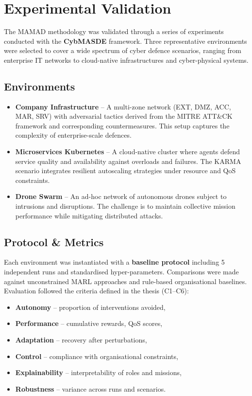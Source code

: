 \documentclass[a4paper,10pt,twocolumn]{article}
\begin{document}
\section{Experimental Validation}

The MAMAD methodology was validated through a series of experiments
conducted with the \textbf{CybMASDE} framework. Three representative
environments were selected to cover a wide spectrum of cyber defence
scenarios, ranging from enterprise IT networks to cloud-native
infrastructures and cyber-physical systems.

\subsection{Environments}
\begin{itemize}
    \item \textbf{Company Infrastructure} – A multi-zone network
          (EXT, DMZ, ACC, MAR, SRV) with adversarial tactics derived from
          the MITRE ATT\&CK framework and corresponding countermeasures.
          This setup captures the complexity of enterprise-scale defences.

    \item \textbf{Microservices Kubernetes} – A cloud-native cluster
          where agents defend service quality and availability against
          overloads and failures. The KARMA scenario integrates resilient
          autoscaling strategies under resource and QoS constraints.

    \item \textbf{Drone Swarm} – An ad-hoc network of autonomous drones
          subject to intrusions and disruptions. The challenge is to maintain
          collective mission performance while mitigating distributed attacks.
\end{itemize}

\subsection{Protocol \& Metrics}

Each environment was instantiated with a \textbf{baseline protocol}
including 5 independent runs and standardised hyper-parameters.
Comparisons were made against unconstrained MARL approaches and
rule-based organisational baselines. Evaluation followed the criteria
defined in the thesis (C1–C6):
\begin{itemize}
    \item \textbf{Autonomy} – proportion of interventions avoided,
    \item \textbf{Performance} – cumulative rewards, QoS scores,
    \item \textbf{Adaptation} – recovery after perturbations,
    \item \textbf{Control} – compliance with organisational constraints,
    \item \textbf{Explainability} – interpretability of roles and missions,
    \item \textbf{Robustness} – variance across runs and scenarios.
\end{itemize}
\end{document}
